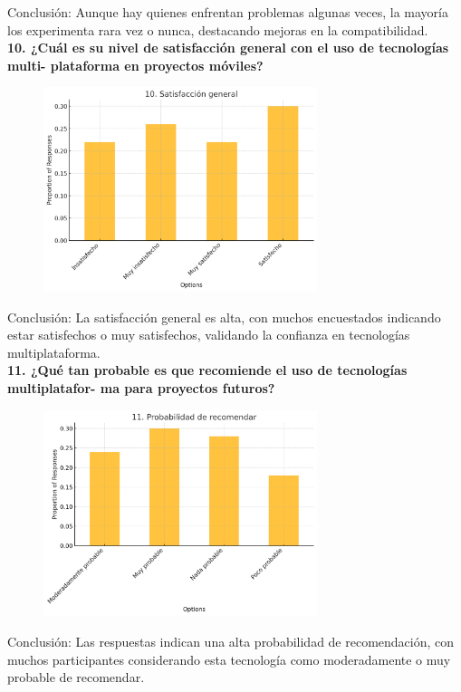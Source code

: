 Conclusión: Aunque hay quienes enfrentan problemas algunas veces, la mayoría los experimenta rara vez o nunca, destacando mejoras en la compatibilidad.\\

\textbf{10. ¿Cuál es su nivel de satisfacción general con el uso de tecnologías multi-
plataforma en proyectos móviles?}

\begin{figure}[h!]
    \includegraphics[width=8cm]{images/question10.png}
    \centering
\end{figure}

Conclusión: La satisfacción general es alta, con muchos encuestados indicando estar satisfechos o muy satisfechos, validando la confianza en tecnologías multiplataforma.\\

\newpage
\textbf{11. ¿Qué tan probable es que recomiende el uso de tecnologías multiplatafor-
ma para proyectos futuros?}

\begin{figure}[h!]
    \includegraphics[width=8cm]{images/question11.png}
    \centering
\end{figure}

Conclusión: Las respuestas indican una alta probabilidad de recomendación, con muchos participantes considerando esta tecnología como moderadamente o muy probable de recomendar.\\

